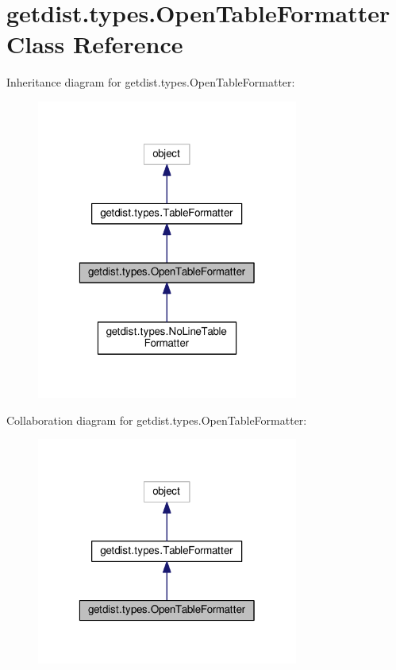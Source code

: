 \hypertarget{classgetdist_1_1types_1_1OpenTableFormatter}{}\section{getdist.\+types.\+Open\+Table\+Formatter Class Reference}
\label{classgetdist_1_1types_1_1OpenTableFormatter}


Inheritance diagram for getdist.\+types.\+Open\+Table\+Formatter\+:
\nopagebreak
\begin{figure}[H]
\begin{center}
\leavevmode
\includegraphics[width=244pt]{classgetdist_1_1types_1_1OpenTableFormatter__inherit__graph}
\end{center}
\end{figure}


Collaboration diagram for getdist.\+types.\+Open\+Table\+Formatter\+:
\nopagebreak
\begin{figure}[H]
\begin{center}
\leavevmode
\includegraphics[width=244pt]{classgetdist_1_1types_1_1OpenTableFormatter__coll__graph}
\end{center}
\end{figure}
